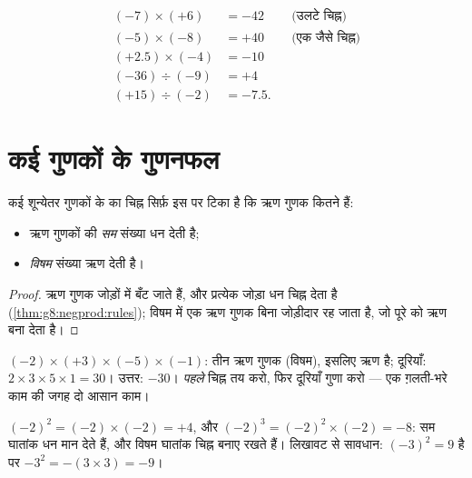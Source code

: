\begin{example}\label{ex:g8:negprod:products}
\begin{align*}
(-7) \times (+6) &= -42 && \text{(उलटे चिह्न)} \\
(-5) \times (-8) &= +40 && \text{(एक जैसे चिह्न)} \\
(+2.5) \times (-4) &= -10 \\
(-36) \div (-9) &= +4 \\
(+15) \div (-2) &= -7.5 .
\end{align*}
\end{example}

\section{कई गुणकों के गुणनफल}

\begin{proposition}[लंबे गुणनफल का चिह्न]\label{prop:g8:negprod:many}
कई शून्येतर गुणकों के  का चिह्न सिर्फ़ इस पर टिका है कि ऋण
गुणक कितने हैं:
\begin{itemize}
  \item ऋण गुणकों की \emph{सम} संख्या धन  देती है;
  \item \emph{विषम} संख्या ऋण  देती है।
\end{itemize}
\end{proposition}

\begin{proof}
ऋण गुणक जोड़ों में बँट जाते हैं, और प्रत्येक जोड़ा धन चिह्न देता है
(\cref{thm:g8:negprod:rules}); विषम  में एक ऋण गुणक बिना
जोड़ीदार रह जाता है, जो पूरे  को ऋण बना देता है।
\end{proof}

\begin{example}\label{ex:g8:negprod:many}
$(-2) \times (+3) \times (-5) \times (-1)$: तीन ऋण गुणक (विषम),
इसलिए  ऋण है; दूरियाँ: $2 \times 3 \times 5 \times 1 = 30$।
उत्तर: $-30$। \emph{पहले} चिह्न तय करो, फिर दूरियाँ गुणा करो --- एक
ग़लती-भरे काम की जगह दो आसान काम।
\end{example}

\begin{example}[ऋण संख्याओं की घातें]\label{ex:g8:negprod:powers}
$(-2)^2 = (-2) \times (-2) = +4$, और
$(-2)^3 = (-2)^2 \times (-2) = -8$: सम घातांक धन मान देते हैं, और
विषम घातांक चिह्न बनाए रखते हैं। लिखावट से सावधान:
$(-3)^2 = 9$ है पर $-3^2 = -(3 \times 3) = -9$।
\end{example}

